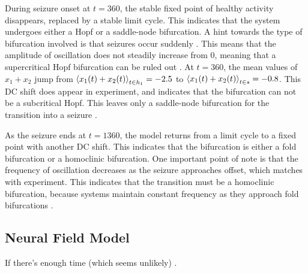 During seizure onset at $t = 360$, the stable fixed point of healthy activity disappears, replaced by a stable limit cycle.
This indicates that the system undergoes either a Hopf or a saddle-node bifurcation.
A hint towards the type of bifurcation involved is that seizures occur suddenly \cite{Kandel2013}.
This means that the amplitude of oscillation does not steadily increase from 0, meaning that a supercritical Hopf bifurcation can be ruled out \cite{Strogatz2015}.
At $t = 360$, the mean values of $x_{1} + x_{2}$ jump from $\expval{x_{1}(t) + x_{2}(t)}_{t \in h_{1}} = -2.5$ to $\expval{x_{1}(t) + x_{2}(t)}_{t \in s} = -0.8$.
This DC shift does appear in experiment, and indicates that the bifurcation can not be a subcritical Hopf.
This leaves only a saddle-node bifurcation for the transition into a seizure \cite{Jirsa2014}.

As the seizure ends at $t = 1360$, the model returns from a limit cycle to a fixed point with another DC shift.
This indicates that the bifurcation is either a fold bifurcation or a homoclinic bifurcation.
One important point of note is that the frequency of oscillation decreases as the seizure approaches offset, which matches with experiment.
This indicates that the transition must be a homoclinic bifurcation, because systems maintain constant frequency as they approach fold bifurcations \cite{Jirsa2014}.


\subsection{Neural Field Model}
\label{sec:lit_review_bifurcation_field}
If there's enough time (which seems unlikely) \cite{Breakspear2005}.


